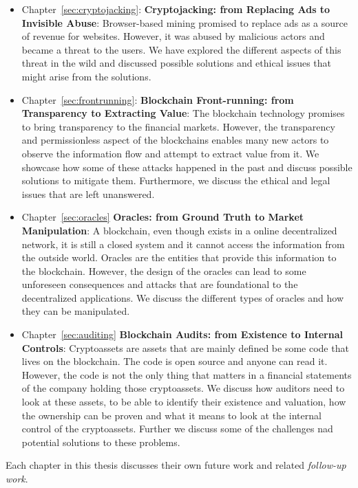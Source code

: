 \begin{itemize}
    \item Chapter~\ref{sec:cryptojacking}: \textbf{Cryptojacking: from Replacing Ads to Invisible Abuse}: Browser-based mining promised to replace ads as a source of revenue for websites. However, it was abused by malicious actors and became a threat to the users. We have explored the different aspects of this threat in the wild and discussed possible solutions and ethical issues that might arise from the solutions.
    \item Chapter~\ref{sec:frontrunning}: \textbf{Blockchain Front-running: from Transparency to Extracting Value}: The blockchain technology promises to bring transparency to the financial markets. However, the transparency and permissionless aspect of the blockchains enables many new actors to observe the information flow and attempt to extract value from it. We showcase how some of these attacks happened in the past and discuss possible solutions to mitigate them. Furthermore, we discuss the ethical and legal issues that are left unanswered.
    \item Chapter~\ref{sec:oracles} \textbf{Oracles: from Ground Truth to Market Manipulation}: A blockchain, even though exists in a online decentralized network, it is still a closed system and it cannot access the information from the outside world. Oracles are the entities that provide this information to the blockchain. However, the design of the oracles can lead to some unforeseen consequences and attacks that are foundational to the decentralized applications. We discuss the different types of oracles and how they can be manipulated. 
    \item Chapter~\ref{sec:auditing} \textbf{Blockchain Audits: from Existence to Internal Controls}: Cryptoassets are assets that are mainly defined be some code that lives on the blockchain. The code is open source and anyone can read it. However, the code is not the only thing that matters in a financial statements of the company holding those cryptoassets. We discuss how auditors need to look at these assets, to be able to identify their existence and valuation, how the ownership can be proven and what it means to look at the internal control of the cryptoassets. Further we discuss some of the challenges nad potential solutions to these problems. 
\end{itemize}


Each chapter in this thesis discusses their own future work and related \textit{follow-up work}. %





